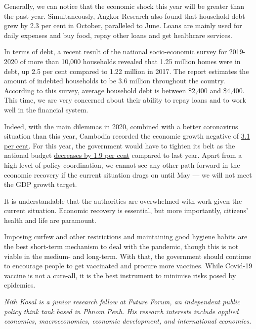 \documentclass[10pt,a4paper]{letter}
\begin{document}
Generally, we can notice that the economic shock this year will be greater than the past year. Simultaneously, Angkor Research also found that household debt grew by 2.3 per cent in October, paralleled to June. Loans are mainly used for daily expenses and buy food, repay other loans and get healthcare services.

In terms of debt, a recent result of the \href{https://www.nis.gov.kh/nis/CSES/Final%20Report%20of%20Cambodia%20Socio-Economic%20Survey%202019-20_EN.pdf}{national socio-economic survey} for 2019-2020 of more than 10,000 households revealed that 1.25 million homes were in debt, up 2.5 per cent compared to 1.22 million in 2017. The report estimates the amount of indebted households to be 3.6 million throughout the country. According to this survey, average household debt is between \$2,400 and \$4,400. This time, we are very concerned about their ability to repay loans and to work well in the financial system.

Indeed, with the main dilemmas in 2020, combined with a better coronavirus situation than this year, Cambodia recorded the economic growth negative of \href{https://www.voacambodia.com/a/fast-spreading-cluster-puts-economic-rebound-on-the-back-burner/5813220.html}{3.1 per cent}. For this year, the government would have to tighten its belt as the national budget \href{https://www.phnompenhpost.com/national/govt-approves-2021-budget}{decreases by 1.9 per cent} compared to last year. Apart from a high level of policy coordination, we cannot see any other path forward in the economic recovery if the current situation drags on until May --- we will not meet the GDP growth target.

It is understandable that the authorities are overwhelmed with work given the current situation. Economic recovery is essential, but more importantly, citizens' health and life are paramount.

Imposing curfew and other restrictions and maintaining good hygiene habits are the best short-term mechanism to deal with the pandemic, though this is not viable in the medium- and long-term. With that, the government should continue to encourage people to get vaccinated and procure more vaccines. While Covid-19 vaccine is not a cure-all, it is the best instrument to minimise risks posed by epidemics.


\textit{Nith Kosal is a junior research fellow at Future Forum, an independent public policy think tank based in Phnom Penh. His research interests include applied economics, macroeconomics, economic development, and international economics.}
\end{document}
